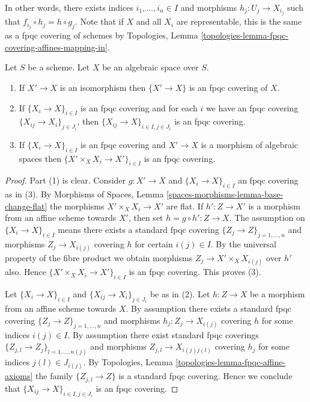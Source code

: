\noindent
In other words, there exists indices $i_1, \ldots, i_n \in I$ and
morphisms $h_j : U_j \to X_{i_j}$ such that
$f_{i_j} \circ h_j = h \circ g_j$. Note that if $X$ and all $X_i$ are
representable, this is the same as a fpqc covering of schemes by
Topologies, Lemma \ref{topologies-lemma-fpqc-covering-affines-mapping-in}.

\begin{lemma}
\label{lemma-fpqc}
Let $S$ be a scheme.
Let $X$ be an algebraic space over $S$.
\begin{enumerate}
\item If $X' \to X$ is an isomorphism then $\{X' \to X\}$
is an fpqc covering of $X$.
\item If $\{X_i \to X\}_{i\in I}$ is an fpqc covering and for each
$i$ we have an fpqc covering $\{X_{ij} \to X_i\}_{j\in J_i}$, then
$\{X_{ij} \to X\}_{i \in I, j\in J_i}$ is an fpqc covering.
\item If $\{X_i \to X\}_{i\in I}$ is an fpqc covering
and $X' \to X$ is a morphism of algebraic spaces then
$\{X' \times_X X_i \to X'\}_{i\in I}$ is an fpqc covering.
\end{enumerate}
\end{lemma}

\begin{proof}
Part (1) is clear. Consider $g : X' \to X$ and
$\{X_i \to X\}_{i\in I}$ an fpqc covering as in (3). By
Morphisms of Spaces, Lemma \ref{spaces-morphisms-lemma-base-change-flat}
the morphisms $X' \times_X X_i \to X'$
are flat. If $h' : Z \to X'$ is a morphism from an affine scheme
towards $X'$, then set $h = g \circ h' : Z \to X$. The assumption
on $\{X_i \to X\}_{i\in I}$ means there exists a standard fpqc covering
$\{Z_j \to Z\}_{j = 1, \ldots, n}$ and morphisms $Z_j \to X_{i(j)}$ covering
$h$ for certain $i(j) \in I$. By the universal property of the fibre product
we obtain morphisms $Z_j \to X' \times_X X_{i(j)}$ over $h'$ also.
Hence $\{X' \times_X X_i \to X'\}_{i\in I}$ is an fpqc covering.
This proves (3).

\medskip\noindent
Let $\{X_i \to X\}_{i\in I}$ and $\{X_{ij} \to X_i\}_{j\in J_i}$ be as
in (2). Let $h : Z \to X$ be a morphism from an affine scheme towards $X$.
By assumption there exists a standard fpqc covering
$\{Z_j \to Z\}_{j = 1, \ldots, n}$ and morphisms $h_j : Z_j \to X_{i(j)}$
covering $h$ for some indices $i(j) \in I$. By assumption there exist
standard fpqc coverings
$\{Z_{j, l} \to Z_j\}_{l = 1, \ldots, n(j)}$
and morphisms $Z_{j, l} \to X_{i(j)j(l)}$ covering
$h_j$ for some indices $j(l) \in J_{i(j)}$. By
Topologies, Lemma \ref{topologies-lemma-fpqc-affine-axioms}
the family $\{Z_{j, l} \to Z\}$ is a standard fpqc covering.
Hence we conclude that $\{X_{ij} \to X\}_{i \in I, j\in J_i}$
is an fpqc covering.
\end{proof}

